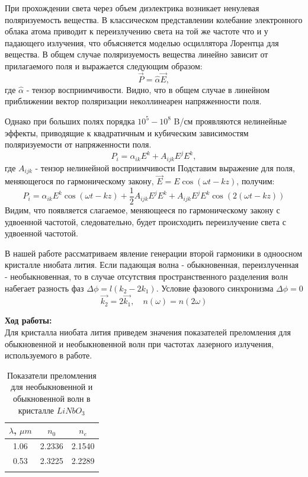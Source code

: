 \documentclass[a4paper, 12pt]{article}%
\begin{document}
	При прохождении света через объем диэлектрика возникает ненулевая поляризуемость вещества. В классическом представлении колебание электронного облака атома приводит к переизлучению света на той же частоте что и у падающего излучения, что объясняется моделью осциллятора Лорентца для вещества. В общем случае поляризуемость вещества линейно зависит от прилагаемого поля и выражается следующим образом:
	\begin{equation}
		\vec{P} = \hat{\alpha}\vec{E},
	\end{equation}
	где $\hat{\alpha}$ - тензор восприимчивости. Видно, что в общем случае в линейном приближении вектор поляризации неколлинеарен напряженности поля.
	\par Однако при больших полях порядка $10^{5} - 10^{8}$ B/см проявляются нелинейные эффекты, приводящие к квадратичным и кубическим зависимостям поляризуемости от напряженности поля.
	\begin{equation}
		P_i = \alpha_{ik}E^k + A_{ijk}E^jE^k,
	\end{equation}
	где $A_{ijk}$ - тензор нелинейной восприимчивости 
	Подставим выражение для поля, меняющегося по гармоническому закону, $\vec{E} = E\cos(\omega t - kz)$, получим:
	\begin{equation}
		P_i = \alpha_{ik}E^k\cos(\omega t - kz) + \frac{1}{2}A_{ijk}E^jE^k + A_{ijk}E^jE^k\cos(2(\omega t - kz))
	\end{equation}
	Видим, что появляется слагаемое, меняющееся по гармоническому закону с удвоенной частотой, следовательно, будет происходить переизлучение света с удвоенной частотой.
	\par В нашей работе рассматриваем явление генерации второй гармоники в одноосном кристалле ниобата лития. Если падающая волна - обыкновенная, переизлученная - необыкновенная, то в случае отсутствия пространственного разделения волн набегает разность фаз $\Delta\phi = l(k_2 - 2k_1)$. Условие фазового синхронизма $\Delta\phi =0$
	\begin{equation}
		\vec{k_2} = 2\vec{k_1}, \quad n(\omega) = n(2\omega)
	\end{equation}
	
	\newpage
	
	\textbf{Ход работы: }\\
	
	Для кристалла ниобата лития приведем значения показателей преломления для обыкновенной и необыкновенной волн при частотах лазерного излучения, используемого в работе.

	
	\begin{longtable}{|c|c|c|}
		\hline
		$\lambda$, $\mu m$ & $n_0$ & $n_e$ \\
		\hline
		1.06 & 2.2336 & 2.1540 \\
		\hline
		0.53 & 2.3225 & 2.2289 \\
		\hline
		\caption{Показатели преломления для необыкновенной и обыкновенной волн в кристалле $LiNbO_3$}
	\end{longtable}
\end{document}
